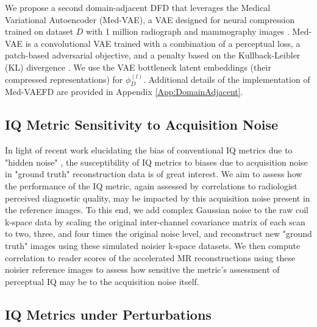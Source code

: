 \documentclass[AMA,STIX2COL,Linenumberson]{MRM}
\begin{document}
We propose a second domain-adjacent DFD that leverages the Medical Variational Autoencoder (Med-VAE), a VAE designed for neural compression trained on dataset $D$ with 1 million radiograph and mammography images \cite{van2023diagnostically}. Med-VAE is a convolutional VAE trained with a combination of a perceptual loss, a patch-based adversarial objective, and a penalty based on the Kullback-Leibler (KL) divergence \cite{van2023diagnostically}. We use the VAE bottleneck latent embeddings (their compressed representations) for $\phi_D^{(l)}$. Additional details of the implementation of Med-VAEFD are provided in Appendix \ref{App:DomainAdjacent}.


\subsection{IQ Metric Sensitivity to Acquisition Noise}
In light of recent work elucidating the bias of conventional IQ metrics due to "hidden noise" \cite{wang2024hidden}, the susceptibility of IQ metrics to biases due to acquisition noise in "ground truth" reconstruction data is of great interest. We aim to assess how the performance of the IQ metric, again assessed by correlations to radiologist perceived diagnostic quality, may be impacted by this acquisition noise present in the reference images. To this end, we add complex Gaussian noise to the raw coil k-space data by scaling the original inter-channel covariance matrix of each scan to two, three, and four times the original noise level, and reconstruct new "ground truth" images using these simulated noisier k-space datasets. We then compute correlation to reader scores of the accelerated MR reconstructions using these noisier reference images to assess how sensitive the metric's assessment of perceptual IQ may be to the acquisition noise itself.

\subsection{IQ Metrics under Perturbations}
\end{document}
